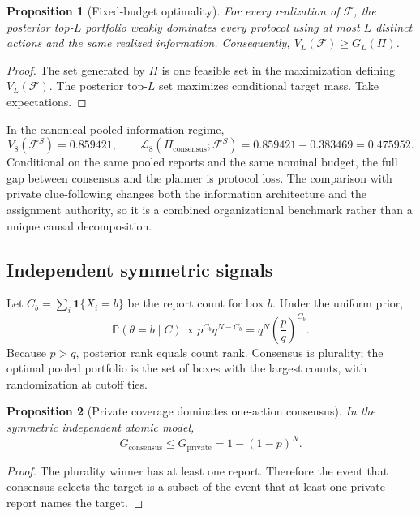 \documentclass[11pt]{article}
\newtheorem{proposition}{Proposition}
\theoremstyle{definition}
\theoremstyle{remark}
\newcommand{\Prob}{\mathbb{P}}
\newcommand{\1}{\mathbf{1}}
\newcommand{\F}{\mathcal{F}}
\newcommand{\Loss}{\mathcal{L}}
\newcommand{\priv}{\mathrm{private}}
\newcommand{\cons}{\mathrm{consensus}}
\begin{document}
\begin{proposition}[Fixed-budget optimality]
For every realization of $\F$, the posterior top-$L$ portfolio weakly dominates every protocol using at most $L$ distinct actions and the same realized information. Consequently, $V_L(\F)\ge G_L(\Pi)$.
\end{proposition}

\begin{proof}
The set generated by $\Pi$ is one feasible set in the maximization defining $V_L(\F)$. The posterior top-$L$ set maximizes conditional target mass. Take expectations.
\end{proof}

In the canonical pooled-information regime,
\[
V_8(\F^S)=0.859421,
\qquad
\Loss_8(\Pi_{\cons};\F^S)=0.859421-0.383469=0.475952.
\]
Conditional on the same pooled reports and the same nominal budget, the full gap between consensus and the planner is protocol loss. The comparison with private clue-following changes both the information architecture and the assignment authority, so it is a combined organizational benchmark rather than a unique causal decomposition.

\subsection{Independent symmetric signals}
\label{sec:signals}

Let $C_b=\sum_i\1\{X_i=b\}$ be the report count for box $b$. Under the uniform prior,
\begin{equation}
\Prob(\theta=b\mid C)
\propto p^{C_b}q^{N-C_b}
=q^N\left(\frac{p}{q}\right)^{C_b}.
\label{eq:posterior-count}
\end{equation}
Because $p>q$, posterior rank equals count rank. Consensus is plurality; the optimal pooled portfolio is the set of boxes with the largest counts, with randomization at cutoff ties.

\begin{proposition}[Private coverage dominates one-action consensus]
In the symmetric independent atomic model,
\[
G_{\cons}\le G_{\priv}=1-(1-p)^N.
\]
\end{proposition}

\begin{proof}
The plurality winner has at least one report. Therefore the event that consensus selects the target is a subset of the event that at least one private report names the target.
\end{proof}
\end{document}
